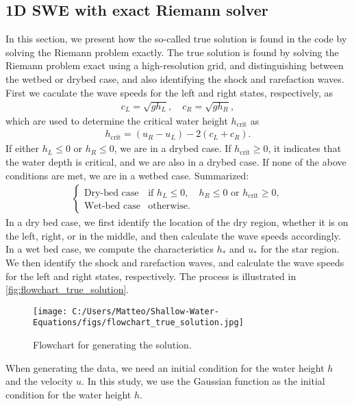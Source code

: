 \subsection*{1D SWE with exact Riemann solver}
In this section, we present how the so-called true solution is found in the code by solving the Riemann problem exactly.
The true solution is found by solving the Riemann problem exact using a high-resolution grid, and distinguishing between the wetbed or drybed case, and also identifying the shock and rarefaction waves.
First we caculate the wave speeds for the left and right states, respectively, as
\begin{align*}
    c_L = \sqrt{g h_L}, \quad c_R = \sqrt{g h_R},
\end{align*}
which are used to determine the critical water height $h_{\text{crit}}$ as
\begin{align*}
    h_{\text{crit}} = (u_R - u_L) - 2(c_L + c_R).
\end{align*}
If either $h_L \leq 0$ or $h_R \leq 0$, we are in a drybed case.
If $h_{\text{crit}} \geq 0$, it indicates that the water depth is critical, and we are also in a drybed case.
If none of the above conditions are met, we are in a wetbed case.
Summarized:
\begin{align*}
    \begin{cases}
        \text{Dry-bed case} & \text{if }  h_L \leq 0, \quad  h_R \leq 0 \text{ or } h_{\text{crit}} \geq 0, \\
        \text{Wet-bed case} & \text{otherwise}.
    \end{cases}
\end{align*}
In a dry bed case, we first identify the location of the dry region, whether it is on the left, right, or in the middle, and then calculate the wave speeds accordingly.
In a wet bed case, we compute the characteristics $h_*$ and $u_*$ for the star region.
We then identify the shock and rarefaction waves, and calculate the wave speeds for the left and right states, respectively.
The process is illustrated in \autoref{fig:flowchart_true_solution}.
\begin{figure}[H]
    \centering
    \texttt{[image: C:/Users/Matteo/Shallow-Water-Equations/figs/flowchart\_true\_solution.jpg]}
    \caption{Flowchart for generating the solution.}\label{fig:flowchart_true_solution}
\end{figure}
When generating the data, we need an initial condition for the water height $h$ and the velocity $u$.
In this study, we use the Gaussian function as the initial condition for the water height $h$.
